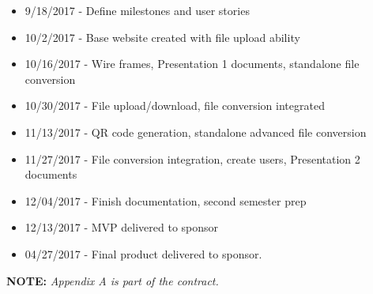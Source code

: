 \begin{itemize}
	\item 9/18/2017    - Define milestones and user stories
	
	\item 10/2/2017    - Base website created with file upload ability
	
	\item 10/16/2017  - Wire frames, Presentation 1 documents, standalone file conversion
	
	\item 10/30/2017  - File upload/download, file conversion integrated
	
	\item 11/13/2017  - QR code generation, standalone advanced file conversion 
	
	\item 11/27/2017  - File conversion integration, create users, Presentation 2 documents
	
	\item 12/04/2017   - Finish documentation, second semester prep
	
	\item 12/13/2017  - MVP delivered to sponsor

	\item 04/27/2017  - Final product delivered to sponsor.
\end{itemize}


\vspace{2\baselineskip}
\centerline{\Large {\bf NOTE:} {\em Appendix A is part of the contract.}}

